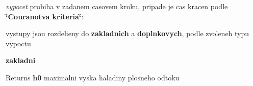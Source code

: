 {\itshape vypocet} probiha v zadanem casovem kroku, pripade je cas kracen podle {\bfseries \char`\"{}\-Couranotva kriteria\char`\"{}}\-:
\begin{DoxyItemize}
\item vystupy jsou rozdelieny do {\bfseries zakladnich} a {\bfseries doplnkovych}, podle zvoleneh typu vypoctu
\item {\bfseries zakladni} 
\begin{DoxyItemize}
\item \begin{DoxyReturn}{Returns}
{\bfseries h0} maximalni vyska haladiny plosneho odtoku 
\end{DoxyReturn}

\end{DoxyItemize}
\end{DoxyItemize}